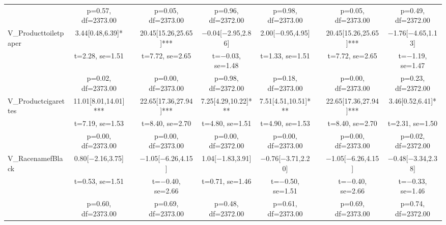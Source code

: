 \documentclass[]{report}
\begin{document}
\begin{table}
{\begin{tabular}[t]{lcccccccc}
		& p=\num{0.57}, df=\num{2373.00} &  & p=\num{0.05}, df=\num{2373.00} & p=\num{0.96}, df=\num{2372.00} & p=\num{0.98}, df=\num{2373.00} &  & p=\num{0.05}, df=\num{2373.00} & p=\num{0.49}, df=\num{2372.00}\\
		V\_Producttoiletpaper & \num{3.44}[\num{0.48},\num{6.39}]* &  & \num{20.45}[\num{15.26},\num{25.65}]*** & \num{-0.04}[\num{-2.95},\num{2.86}] & \num{2.00}[\num{-0.95},\num{4.95}] &  & \num{20.45}[\num{15.26},\num{25.65}]*** & \num{-1.76}[\num{-4.65},\num{1.13}]\\
		& t=\num{2.28}, se=\num{1.51} &  & t=\num{7.72}, se=\num{2.65} & t=\num{-0.03}, se=\num{1.48} & t=\num{1.33}, se=\num{1.51} &  & t=\num{7.72}, se=\num{2.65} & t=\num{-1.19}, se=\num{1.47}\\
		& p=\num{0.02}, df=\num{2373.00} &  & p=\num{0.00}, df=\num{2373.00} & p=\num{0.98}, df=\num{2372.00} & p=\num{0.18}, df=\num{2373.00} &  & p=\num{0.00}, df=\num{2373.00} & p=\num{0.23}, df=\num{2372.00}\\
		V\_Productcigarettes & \num{11.01}[\num{8.01},\num{14.01}]*** &  & \num{22.65}[\num{17.36},\num{27.94}]*** & \num{7.25}[\num{4.29},\num{10.22}]*** & \num{7.51}[\num{4.51},\num{10.51}]*** &  & \num{22.65}[\num{17.36},\num{27.94}]*** & \num{3.46}[\num{0.52},\num{6.41}]*\\
		& t=\num{7.19}, se=\num{1.53} &  & t=\num{8.40}, se=\num{2.70} & t=\num{4.80}, se=\num{1.51} & t=\num{4.90}, se=\num{1.53} &  & t=\num{8.40}, se=\num{2.70} & t=\num{2.31}, se=\num{1.50}\\
		& p=\num{0.00}, df=\num{2373.00} &  & p=\num{0.00}, df=\num{2373.00} & p=\num{0.00}, df=\num{2372.00} & p=\num{0.00}, df=\num{2373.00} &  & p=\num{0.00}, df=\num{2373.00} & p=\num{0.02}, df=\num{2372.00}\\ \hline
		V\_RacenamefBlack & \num{0.80}[\num{-2.16},\num{3.75}] &  & \num{-1.05}[\num{-6.26},\num{4.15}] & \num{1.04}[\num{-1.83},\num{3.91}] & \num{-0.76}[\num{-3.71},\num{2.20}] &  & \num{-1.05}[\num{-6.26},\num{4.15}] & \num{-0.48}[\num{-3.34},\num{2.38}]\\
		& t=\num{0.53}, se=\num{1.51} &  & t=\num{-0.40}, se=\num{2.66} & t=\num{0.71}, se=\num{1.46} & t=\num{-0.50}, se=\num{1.51} &  & t=\num{-0.40}, se=\num{2.66} & t=\num{-0.33}, se=\num{1.46}\\
		& p=\num{0.60}, df=\num{2373.00} &  & p=\num{0.69}, df=\num{2373.00} & p=\num{0.48}, df=\num{2372.00} & p=\num{0.61}, df=\num{2373.00} &  & p=\num{0.69}, df=\num{2373.00} & p=\num{0.74}, df=\num{2372.00}\\

\end{tabular}}
\end{table}
\end{document}
